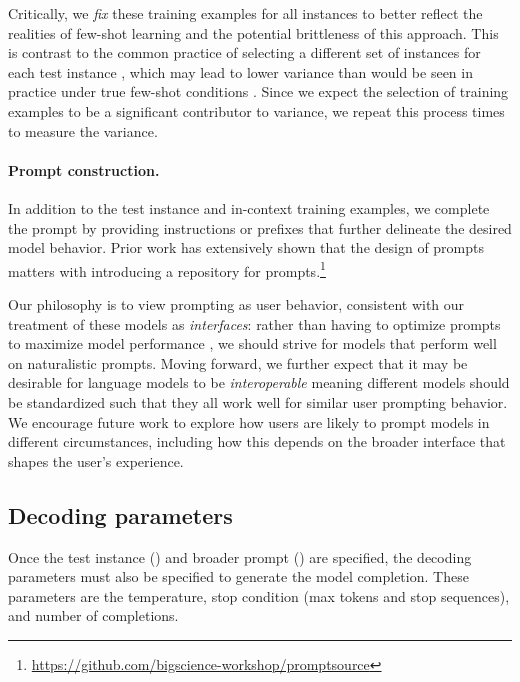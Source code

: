 Critically, we \textit{fix} these training examples for all instances to better reflect the realities of few-shot learning and the potential brittleness of this approach.
This is contrast to the common practice of selecting a different set of instances for each test instance \citep{brown2020gpt3}, which may lead to lower variance than would be seen in practice under true few-shot conditions \citep{perez2021true}.
Since we expect the selection of training examples to be a significant contributor to variance, we repeat this process \numruns times to measure the variance.

\paragraph{Prompt construction.}
In addition to the test instance and in-context training examples, we complete the prompt by providing instructions or prefixes that further delineate the desired model behavior.
Prior work has extensively shown that the design of prompts matters \citep{lescao2021prompt, liu2022incontext} with \citet{bach2022promptsource} introducing a repository for prompts.\footnote{\url{https://github.com/bigscience-workshop/promptsource}}

Our philosophy is to view prompting as user behavior, consistent with our treatment of these models as \textit{interfaces}: rather than having to optimize prompts to maximize model performance \citep{shin2020autoprompt}, we should strive for models that perform well on naturalistic prompts.
Moving forward, we further expect that it may be desirable for language models to be \textit{interoperable} meaning different models should be standardized such that they all work well for similar user prompting behavior.
We encourage future work to explore how users are likely to prompt models in different circumstances, including how this depends on the broader interface that shapes the user's experience.

\subsection{Decoding parameters}
\label{sec:decoding-parameters}

Once the test instance () and broader prompt () are specified, the decoding parameters must also be specified to generate the model completion.
These parameters are the temperature, stop condition (\ie max tokens and stop sequences), and number of completions.

